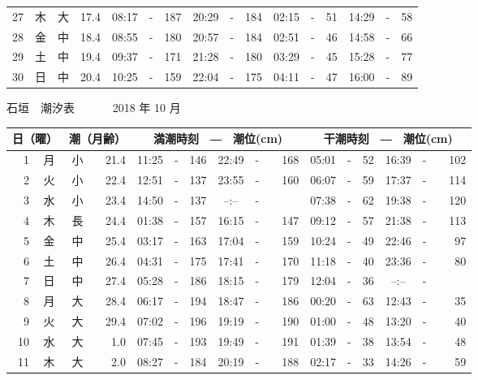 \documentclass[12pt.a4j]{jsarticle}
\begin{document}
\begin{center}
\begin{table}[ht]
\begin{tabular}{|rc|cr|ccrccr|ccrccr|}
27 & 木 & 大 & 17.4 &  08:17 &-& 187  &  20:29 &-& 184  &   02:15 &-&  51  &   14:29 &-&  58  \\
28 & 金 & 中 & 18.4 &  08:55 &-& 180  &  20:57 &-& 184  &   02:51 &-&  46  &   14:58 &-&  66  \\
29 & 土 & 中 & 19.4 &  09:37 &-& 171  &  21:28 &-& 180  &   03:29 &-&  45  &   15:28 &-&  77  \\
30 & 日 & 中 & 20.4 &  10:25 &-& 159  &  22:04 &-& 175  &   04:11 &-&  47  &   16:00 &-&  89  \\
   \hline
   \end{tabular}
\end{table}
\newpage
 {\LARGE 石垣　潮汐表　　　}
 {\large 2018 年 10 月}\\
 \begin{table}[ht]
    \begin{tabular}{|rc|cr|ccrccr|ccrccr|}
    \hline
    \multicolumn{2}{|c|}{日（曜）} & \multicolumn{2}{c|}{潮（月齢）} & \multicolumn{6}{c|}{満潮時刻　―　潮位(cm)} & \multicolumn{6}{c|}{干潮時刻　―　潮位(cm)} \\
 \hline
 1 & 月 & 小 & 21.4 &  11:25 &-& 146  &  22:49 &-& 168  &   05:01 &-&  52  &   16:39 &-& 102  \\
 2 & 火 & 小 & 22.4 &  12:51 &-& 137  &  23:55 &-& 160  &   06:07 &-&  59  &   17:37 &-& 114  \\
 3 & 水 & 小 & 23.4 &  14:50 &-& 137  &  --:-- &-&~~~~~ &   07:38 &-&  62  &   19:38 &-& 120  \\
 4 & 木 & 長 & 24.4 &  01:38 &-& 157  &  16:15 &-& 147  &   09:12 &-&  57  &   21:38 &-& 113  \\
 5 & 金 & 中 & 25.4 &  03:17 &-& 163  &  17:04 &-& 159  &   10:24 &-&  49  &   22:46 &-&  97  \\
 6 & 土 & 中 & 26.4 &  04:31 &-& 175  &  17:41 &-& 170  &   11:18 &-&  40  &   23:36 &-&  80  \\
 7 & 日 & 中 & 27.4 &  05:28 &-& 186  &  18:15 &-& 179  &   12:04 &-&  36  &   --:-- &-&~~~~~ \\
 8 & 月 & 大 & 28.4 &  06:17 &-& 194  &  18:47 &-& 186  &   00:20 &-&  63  &   12:43 &-&  35  \\
 9 & 火 & 大 & 29.4 &  07:02 &-& 196  &  19:19 &-& 190  &   01:00 &-&  48  &   13:20 &-&  40  \\
10 & 水 & 大 &  1.0 &  07:45 &-& 193  &  19:49 &-& 191  &   01:39 &-&  38  &   13:54 &-&  48  \\
11 & 木 & 大 &  2.0 &  08:27 &-& 184  &  20:19 &-& 188  &   02:17 &-&  33  &   14:26 &-&  59  \\

\end{tabular}
\end{table}
\end{center}
\end{document}
